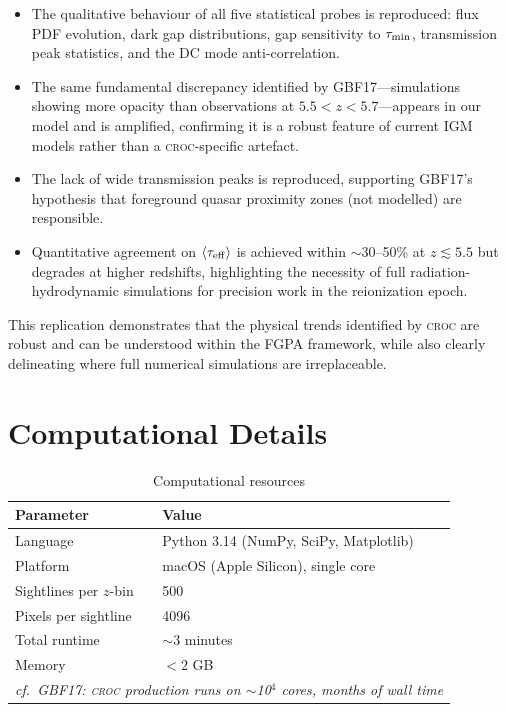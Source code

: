 \documentclass[11pt]{article}
\newcommand{\taueff}{\tau_{\rm eff}}
\newcommand{\taumin}{\tau_{\rm min}}
\newcommand{\croc}{\textsc{croc}}
\begin{document}
\begin{itemize}[leftmargin=*]
    \item The qualitative behaviour of all five statistical probes is reproduced: flux PDF evolution, dark gap distributions, gap sensitivity to $\taumin$, transmission peak statistics, and the DC mode anti-correlation.

    \item The same fundamental discrepancy identified by GBF17---simulations showing more opacity than observations at $5.5 < z < 5.7$---appears in our model and is amplified, confirming it is a robust feature of current IGM models rather than a \croc{}-specific artefact.

    \item The lack of wide transmission peaks is reproduced, supporting GBF17's hypothesis that foreground quasar proximity zones (not modelled) are responsible.

    \item Quantitative agreement on $\langle\taueff\rangle$ is achieved within $\sim$30--50\% at $z \lesssim 5.5$ but degrades at higher redshifts, highlighting the necessity of full radiation-hydrodynamic simulations for precision work in the reionization epoch.
\end{itemize}

This replication demonstrates that the physical trends identified by \croc{} are robust and can be understood within the FGPA framework, while also clearly delineating where full numerical simulations are irreplaceable.

\section{Computational Details}

\begin{table}[H]
\centering
\caption{Computational resources}
\label{tab:compute}
\begin{tabular}{@{}ll@{}}
\toprule
\textbf{Parameter} & \textbf{Value} \\
\midrule
Language & Python 3.14 (NumPy, SciPy, Matplotlib) \\
Platform & macOS (Apple Silicon), single core \\
Sightlines per $z$-bin & 500 \\
Pixels per sightline & 4096 \\
Total runtime & $\sim$3 minutes \\
Memory & $< 2$ GB \\
\midrule
\multicolumn{2}{l}{\textit{cf.\ GBF17: \croc{} production runs on $\sim$10$^4$ cores, months of wall time}} \\
\bottomrule
\end{tabular}
\end{table}
\end{document}
